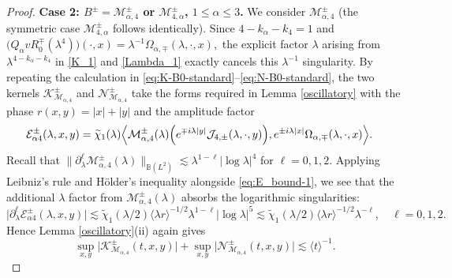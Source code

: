 \documentclass[reqno]{amsart}
\numberwithin{equation}{section}
\begin{document}
\begin{proof}
	

	\textbf{Case 2: $B^\pm=\mathcal{M}_{\alpha,4}^\pm$ or
		$\mathcal{M}_{4,\alpha}^\pm$, $1\leq\alpha\leq3$.}
	We consider $\mathcal{M}_{\alpha,4}^\pm$ (the symmetric case $\mathcal{M}_{4,\alpha}^{\pm}$ follows identically). Since
	$
	4-k_\alpha-k_4=1
	$
	and
	$
	\bigl(
	Q_\alpha vR_0^\mp(\lambda^4)
	\bigr)(\cdot,x)
	=
	\lambda^{-1}
	\Omega_{\alpha,\mp}(\lambda,\cdot,x),
	$
	the explicit factor $\lambda$ arising from
	$\lambda^{4-k_\alpha-k_4}$  in
	\eqref{K_1} and \eqref{Lambda_1} exactly cancels this
	$\lambda^{-1}$ singularity. By repeating the calculation in
	\eqref{eq:K-B0-standard}--\eqref{eq:N-B0-standard}, the two kernels $	\mathcal{K}_{\mathcal{M}_{\alpha,4}}^\pm$ and $	\mathcal{N}_{\mathcal{M}_{\alpha,4}}^\pm$ 
	take the forms required in Lemma \ref{oscillatory} with the  phase
	$
	r(x,y)=|x|+|y|
	$
	and the  amplitude factor
	\begin{align*}
		\mathcal{E}_{\alpha4}^\pm(\lambda,x,y)
		={}&
		\widetilde{\chi}_1(\lambda)
		\Bigl\langle
		\mathcal{M}_{\alpha,4}^\pm(\lambda)
		\Bigl(
		e^{\mp i\lambda|y|}
		\mathcal{J}_{4,\pm}(\lambda,\cdot,y)
		\Bigr),
		e^{\pm i\lambda|x|}
		\Omega_{\alpha,\mp}(\lambda,\cdot,x)
		\Bigr\rangle.
	\end{align*}
	Recall that
$
\|\partial_\lambda^\ell \mathcal{M}_{\alpha, 4}^{\pm}(\lambda)\|_{\mathbb{B}(L^2)} \lesssim \lambda^{1-\ell}|\log\lambda|^{4}$ for   $\ell=0,1,2.$ 
Applying Leibniz's rule and H\"older's inequality alongside \eqref{eq:E_bound-1}, we see that the additional $\lambda$ factor from $ \mathcal{M}_{\alpha, 4}^{\pm}(\lambda)$ absorbs the logarithmic singularities:
\[  
\bigl| \partial_\lambda^{\ell} \mathcal{E}_{\alpha4}^\pm(\lambda,x,y) \bigr| \lesssim \widetilde{\chi}_1(\lambda/2) \langle \lambda r \rangle^{-1/2} \lambda^{1-\ell}|\log\lambda|^5 \lesssim \widetilde{\chi}_1(\lambda/2) \langle \lambda r \rangle^{-1/2} \lambda^{-\ell}, \quad \ell = 0,1,2. 
\]   
	Hence Lemma \ref{oscillatory}(ii) again gives
	$$
	\sup_{x,y}
	\bigl|
	\mathcal{K}_{\mathcal{M}_{\alpha,4}}^\pm(t,x,y)
	\bigr|
	+
	\sup_{x,y}
	\bigl|
	\mathcal{N}_{\mathcal{M}_{\alpha,4}}^\pm(t,x,y)
	\bigr|
	\lesssim
	\langle t\rangle^{-1}.
	$$
	

\end{proof}
\end{document}
